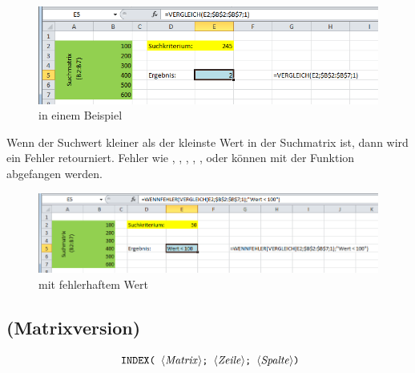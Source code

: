 	\begin{figure}[H]
		\centering
			\includegraphics[scale=0.7]{images/vergleich_1b}
		\caption{ in einem Beispiel}
		\label{fig:vergleich_1}
	\end{figure}
	
	
\begin{infobox}%
Wenn der Suchwert kleiner als der kleinste Wert in der Suchmatrix ist, dann wird ein Fehler  retourniert. Fehler wie , , , , ,  oder  können mit der Funktion  abgefangen werden.
\end{infobox}

	\begin{figure}[H]
		\centering
			\includegraphics[scale=0.7]{images/vergleich_2b}
		\caption{ mit fehlerhaftem Wert}
		\label{fig:vergleich_fehler}
	\end{figure}

\subsection{ (Matrixversion)}

$$ \text{ \stmt{INDEX( \syntax{Matrix}; \syntax{Zeile}; \syntax{Spalte})}}$$

